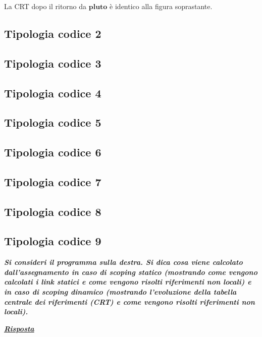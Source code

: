 \documentclass[a4paper]{article}
\begin{document}
	\noindent
	La CRT dopo il ritorno da $\mathbf{pluto}$ è identico alla figura soprastante.
	
	\newpage
	
	
	\subsection{Tipologia codice 2}
	
	\newpage
	
	\subsection{Tipologia codice 3}
	
	\newpage
	
	\subsection{Tipologia codice 4}
	
	\newpage
	
	\subsection{Tipologia codice 5}
	
	\newpage
	
	\subsection{Tipologia codice 6}
	
	\newpage
	
	\subsection{Tipologia codice 7}
	
	\newpage
	
	\subsection{Tipologia codice 8}
	
	\newpage
	
	\subsection{Tipologia codice 9}
	\textcolor{Red3}{\textbf{\emph{Si consideri il programma sulla destra. Si dica cosa viene calcolato dall'assegnamento in caso di scoping statico (mostrando come vengono calcolati i link statici e come vengono risolti riferimenti non locali) e in caso di scoping dinamico (mostrando l'evoluzione della tabella centrale dei riferimenti (CRT) e come vengono risolti riferimenti non locali).}}}
	
	\textcolor{Green4}{\textbf{\emph{\underline{Risposta}}}}\newline
	
\end{document}
